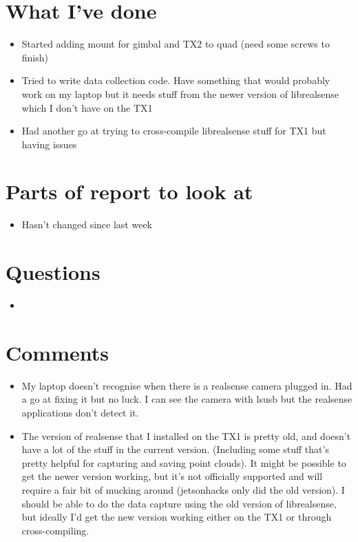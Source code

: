 \documentclass[12pt,a4paper]{article}
\begin{document}
\author{Katrina Ashton}


\pagestyle{fancy}
\fancyhf{}
\rhead{\thepage}

\section{What I've done}
\begin{itemize}
\item{Started adding mount for gimbal and TX2 to quad (need some screws to finish)}
\item{Tried to write data collection code. Have something that would probably work on my laptop but it needs stuff from the newer version of librealsense which I don't have on the TX1}
\item{Had another go at trying to cross-compile librealsense stuff for TX1 but having issues}
\end{itemize}

\section{Parts of report to look at}
\begin{itemize}
\item{Hasn't changed since last week}
\end{itemize}

\section{Questions}
\begin{itemize}
\item{}
\end{itemize}

\section{Comments}
\begin{itemize}
\item{My laptop doesn't recognise when there is a realsense camera plugged in. Had a go at fixing it but no luck. I can see the camera with lsusb but the realsense applications don't detect it.}
\item{The version of realsense that I installed on the TX1 is pretty old, and doesn't have a lot of the stuff in the current version. (Including some stuff that's pretty helpful for capturing and saving point clouds). It might be possible to get the newer version working, but it's not officially supported and will require a fair bit of mucking around (jetsonhacks only did the old version). I should be able to do the data capture using the old version of librealsense, but ideally I'd get the new version working either on the TX1 or through cross-compiling.}
\end{itemize}
\end{document}
